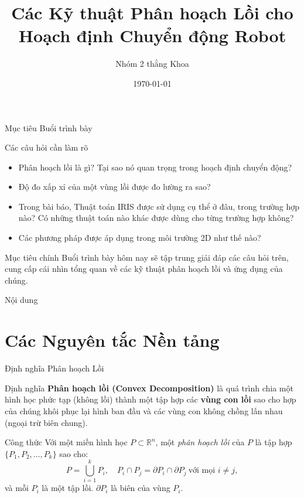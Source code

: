 \documentclass[aspectratio=169]{beamer}
\title{Các Kỹ thuật Phân hoạch Lồi cho Hoạch định Chuyển động Robot}
\author{Nhóm 2 thằng Khoa}
\date{\today}
\begin{document}
\frame{\titlepage}

\begin{frame}{Mục tiêu Buổi trình bày}
    \begin{block}{Các câu hỏi cần làm rõ}
        \begin{itemize}
            \item Phân hoạch lồi là gì? Tại sao nó quan trọng trong hoạch định chuyển động?
            \item Độ đo xấp xỉ của một vùng lồi được đo lường ra sao?
            \item Trong bài báo, Thuật toán IRIS được sử dụng cụ thể ở đâu, trong trường hợp nào? Có những thuật
                  toán nào khác được dùng cho từng trường hợp không?
            \item Các phương pháp được áp dụng trong môi trường 2D như thế nào?
        \end{itemize}
    \end{block}
    \begin{alertblock}{Mục tiêu chính}
        Buổi trình bày hôm nay sẽ tập trung giải đáp các câu hỏi trên, cung cấp cái nhìn tổng quan về các kỹ thuật phân hoạch lồi và ứng dụng của chúng.
    \end{alertblock}
\end{frame}

\begin{frame}{Nội dung}
    \tableofcontents
\end{frame}

\section{Các Nguyên tắc Nền tảng}

\begin{frame}{Định nghĩa Phân hoạch Lồi}

    \begin{block}{Định nghĩa}
        \textbf{Phân hoạch lồi (Convex Decomposition)} là quá trình chia một hình học phức tạp (không lồi) thành một tập hợp các \textbf{vùng con lồi} sao cho hợp của chúng khôi phục lại hình ban đầu và các vùng con không chồng lấn nhau (ngoại trừ biên chung).
    \end{block}

    \begin{block}{Công thức}
        Với một miền hình học $P\subset\mathbb{R}^n$, một \textit{phân hoạch lồi} của $P$ là tập hợp $\{P_1, P_2, \dots, P_k\}$ sao cho:
        \[
            P = \bigcup_{i=1}^{k} P_i, \quad
            P_i \cap P_j = \partial P_i \cap \partial P_j \ \text{với mọi } i \ne j,
        \]
        và mỗi $P_i$ là một tập lồi.
        $\partial P_i$ là biên của vùng $P_i$.
    \end{block}

\end{frame}
\end{document}
